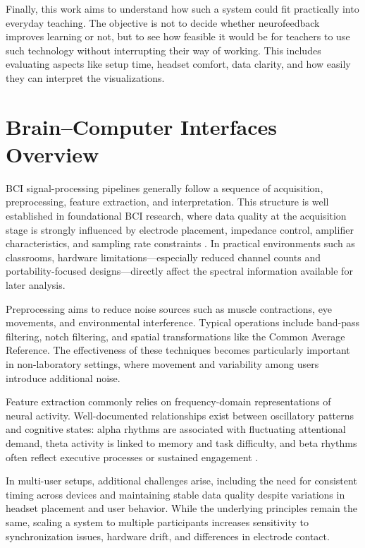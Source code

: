 Finally, this work aims to understand how such a system could fit practically into everyday teaching. The objective is not to decide whether neurofeedback improves learning or not, but to see how feasible it would be for teachers to use such technology without interrupting their way of working. This includes evaluating aspects like setup time, headset comfort, data clarity, and how easily they can interpret the visualizations.

\section{Brain–Computer Interfaces Overview}\label{sect:bciov}
BCI signal-processing pipelines generally follow a sequence of acquisition, preprocessing, feature extraction, and interpretation. This structure is well established in foundational BCI research, where data quality at the acquisition stage is strongly influenced by electrode placement, impedance control, amplifier characteristics, and sampling rate constraints \cite{Wolpaw2012}. In practical environments such as classrooms, hardware limitations—especially reduced channel counts and portability-focused designs—directly affect the spectral information available for later analysis.


Preprocessing aims to reduce noise sources such as muscle contractions, eye movements, and environmental interference. Typical operations include band-pass filtering, notch filtering, and spatial transformations like the Common Average Reference. The effectiveness of these techniques becomes particularly important in non-laboratory settings, where movement and variability among users introduce additional noise.


Feature extraction commonly relies on frequency-domain representations of neural activity. Well-documented relationships exist between oscillatory patterns and cognitive states: alpha rhythms are associated with fluctuating attentional demand, theta activity is linked to memory and task difficulty, and beta rhythms often reflect executive processes or sustained engagement \cite{Niedermeyer2005}.


In multi-user setups, additional challenges arise, including the need for consistent timing across devices and maintaining stable data quality despite variations in headset placement and user behavior. While the underlying principles remain the same, scaling a system to multiple participants increases sensitivity to synchronization issues, hardware drift, and differences in electrode contact.

